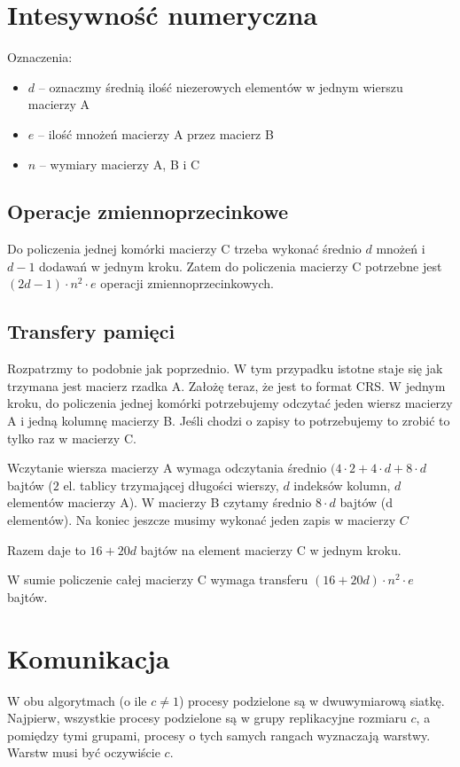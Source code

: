 \documentclass{article}
\begin{document}
\section{Intesywność numeryczna}
Oznaczenia:
\begin{itemize}
  \item $d$ -- oznaczmy średnią ilość niezerowych elementów w jednym wierszu macierzy A
  \item $e$ -- ilość mnożeń macierzy A przez macierz B
  \item $n$ -- wymiary macierzy A, B i C
\end{itemize}

\subsection{Operacje zmiennoprzecinkowe}
Do policzenia jednej komórki macierzy C trzeba wykonać średnio $d$ mnożeń i $d-1$ dodawań
w jednym kroku.
Zatem do policzenia macierzy C potrzebne jest $(2d-1) \cdot n^2 \cdot e$ operacji zmiennoprzecinkowych.

\subsection{Transfery pamięci}
Rozpatrzmy to podobnie jak poprzednio. W tym przypadku istotne staje się jak trzymana jest macierz rzadka A.
Założę teraz, że jest to format CRS.
W jednym kroku, do policzenia jednej komórki potrzebujemy odczytać jeden wiersz macierzy A i jedną kolumnę macierzy B.
Jeśli chodzi o zapisy to potrzebujemy to zrobić to tylko raz w macierzy C.

Wczytanie wiersza macierzy A wymaga odczytania średnio $(4 \cdot 2 + 4 \cdot d + 8 \cdot d$ bajtów ($2$ el. tablicy trzymającej długości wierszy,
$d$ indeksów kolumn, $d$ elementów macierzy A). W macierzy B czytamy średnio $8 \cdot d$ bajtów (d elementów).
Na koniec jeszcze musimy wykonać jeden zapis w macierzy $C$

Razem daje to $16 + 20d$ bajtów na element macierzy C w jednym kroku.

W sumie policzenie całej macierzy C wymaga transferu $(16 + 20d) \cdot n^2 \cdot e$ bajtów.


\section{Komunikacja}
W obu algorytmach (o ile $c \neq 1$) procesy podzielone są w dwuwymiarową siatkę. Najpierw, wszystkie procesy podzielone są w grupy
replikacyjne rozmiaru $c$, a pomiędzy tymi grupami, procesy o tych samych rangach wyznaczają warstwy. Warstw musi być oczywiście $c$.
\end{document}
